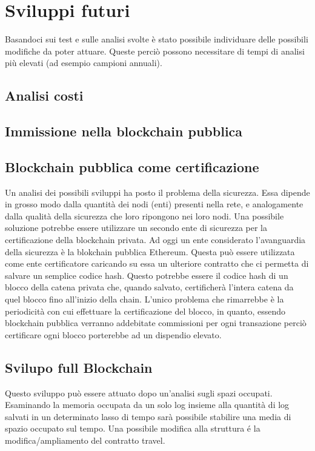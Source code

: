 \documentclass[11pt,a4paper,titlepage]{report}
\begin{document}
\chapter{Sviluppi futuri}
Basandoci sui test e sulle analisi svolte è stato possibile individuare delle possibili modifiche da poter attuare. Queste perciò possono necessitare di tempi di analisi più elevati (ad esempio campioni annuali).

\section{Analisi costi}

\section{Immissione nella blockchain pubblica}

\section{Blockchain pubblica come certificazione}
Un analisi dei possibili sviluppi ha posto il problema della sicurezza. Essa dipende in grosso modo dalla quantità dei nodi (enti) presenti nella rete, e analogamente dalla qualità della sicurezza che loro ripongono nei loro nodi. Una possibile soluzione potrebbe essere utilizzare un secondo ente di sicurezza per la certificazione della blockchain privata. Ad oggi un ente considerato l'avanguardia della sicurezza è la blokchain pubblica Ethereum. Questa può essere utilizzata come ente certificatore caricando su essa un ulteriore contratto che ci permetta di salvare un semplice codice hash. Questo potrebbe essere il codice hash di un blocco della catena privata che, quando salvato, certificherà l'intera catena da quel blocco fino all'inizio della chain. L'unico problema che rimarrebbe è la periodicità con cui effettuare la certificazione del blocco, in quanto, essendo blockchain pubblica verranno addebitate commissioni per ogni transazione perciò certificare ogni blocco porterebbe ad un dispendio elevato.

\section{Svilupo full Blockchain}
Questo sviluppo può essere attuato dopo un'analisi sugli spazi occupati. Esaminando la memoria occupata da un solo log insieme alla quantità di log salvati in un determinato lasso di tempo sarà possibile stabilire una media di spazio occupato sul tempo. Una possibile modifica alla struttura é la modifica/ampliamento del contratto travel.
\begin{lstlisting}[language=Solidity]

\end{lstlisting}
\end{document}
